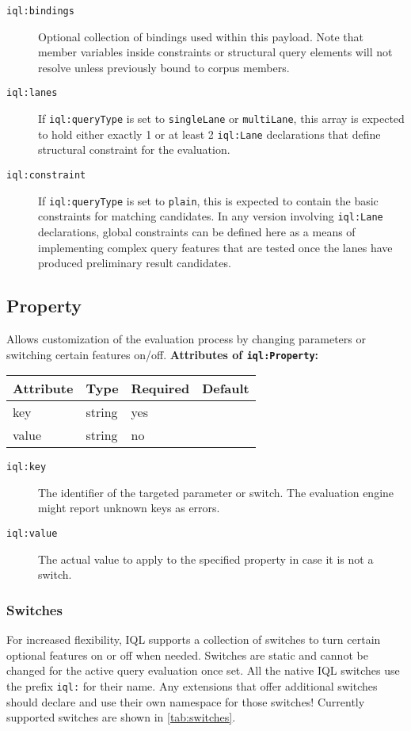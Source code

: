\documentclass[11pt]{article}
\newcommand{\iql}{IQL\xspace}
\newcommand{\iqlns}{iql:}
\newcommand{\iqlType}[1]{\texttt{\iqlns#1}}
\newcommand{\desc}[1]{\noindent#1\newline\medskip}
\newenvironment{attributes}[1]{
\noindent\textbf{Attributes of #1:}\newline\medskip
\begin{tabular}{|p{0.3\textwidth}|p{0.20\textwidth}|p{0.20\textwidth}|p{0.17\textwidth}|}
	\hline
	\textbf{Attribute} & \textbf{Type} & \textbf{Required} & \textbf{Default} \\ 
	\hline
	\hline
}{
\end{tabular}
}
\newcommand{\attribute}[4]{
	#1 & #2 & #3 & #4 \\
	\hline
}
\begin{document}
\begin{description}
	\item[\iqlType{bindings}] Optional collection of bindings used within this payload. Note that member variables inside constraints or structural query elements will not resolve unless previously bound to corpus members.
	\item[\iqlType{lanes}] If \iqlType{queryType} is set to \texttt{singleLane} or \texttt{multiLane}, this array is expected to hold either exactly 1 or at least 2 \iqlType{Lane} declarations that define structural constraint for the evaluation.
	\item[\iqlType{constraint}] If \iqlType{queryType} is set to \texttt{plain}, this is expected to contain the basic constraints for matching candidates. In any version involving \iqlType{Lane} declarations, global constraints can be defined here as a means of implementing complex query features that are tested once the lanes have produced preliminary result candidates.
\end{description}

\subsection{Property}
\label{sec:json-ld-property}
\desc{Allows customization of the evaluation process by changing parameters or switching certain features on/off.}
\begin{attributes}{\iqlType{Property}}
	\attribute{key}{string}{yes}{}
	\attribute{value}{string}{no}{}
\end{attributes}
\begin{description}
	\item[\iqlType{key}] The identifier of the targeted parameter or switch. The evaluation engine might report unknown keys as errors.
	\item[\iqlType{value}] The actual value to apply to the specified property in case it is not a switch.
\end{description}

\subsubsection{Switches}
\label{sec:json-ld-switches}
For increased flexibility, \iql supports a collection of switches to turn certain optional features on or off when needed. Switches are static and cannot be changed for the active query evaluation once set. All the native \iql switches use the prefix \texttt{iql:} for their name. Any extensions that offer additional switches should declare and use their own namespace for those switches! Currently supported switches are shown in \cref{tab:switches}. %
\end{document}

